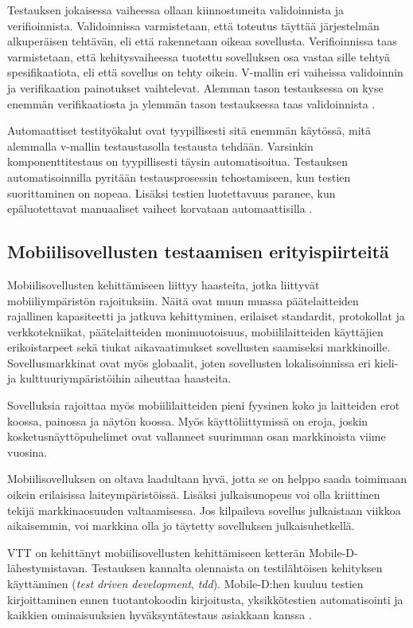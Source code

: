 Testauksen jokaisessa vaiheessa ollaan kiinnostuneita validoinnista ja verifioinnista. Validoinnissa varmistetaan, että toteutus täyttää järjestelmän alkuperäisen tehtävän, eli että rakennetaan oikeaa sovellusta. Verifioinnissa taas varmistetaan, että kehitysvaiheessa tuotettu sovelluksen osa vastaa sille tehtyä spesifikaatiota, eli että sovellus on tehty oikein. V-mallin eri vaiheissa validoinnin ja verifikaation painotukset vaihtelevat. Alemman tason testauksessa on kyse enemmän verifikaatiosta ja ylemmän tason testauksessa taas validoinnista \cite[41-42]{testing_foundations}.

Automaattiset testityökalut ovat tyypillisesti sitä enemmän käytössä, mitä alemmalla v-mallin testaustasolla testausta tehdään. Varsinkin komponenttitestaus on tyypillisesti täysin automatisoitua. Testauksen automatisoinnilla pyritään testausprosessin tehostamiseen, kun testien suorittaminen on nopeaa. Lisäksi testien luotettavuus paranee, kun epäluotettavat manuaaliset vaiheet korvataan automaattisilla \cite[201]{testing_foundations}.

\subsection{Mobiilisovellusten testaamisen erityispiirteitä}

Mobiilisovellusten kehittämiseen liittyy haasteita, jotka liittyvät mobiiliympäristön rajoituksiin. Näitä ovat muun muassa päätelaitteiden rajallinen kapasiteetti ja jatkuva kehittyminen, erilaiset standardit, protokollat ja verkkotekniikat, päätelaitteiden monimuotoisuus, mobiililaitteiden käyttäjien erikoistarpeet sekä tiukat aikavaatimukset sovellusten saamiseksi markkinoille. Sovellusmarkkinat ovat myös globaalit, joten sovellusten lokalisoinnissa eri kieli- ja kulttuuriympäristöihin aiheuttaa haasteita.

Sovelluksia rajoittaa myös mobiililaitteiden pieni fyysinen koko ja laitteiden erot koossa, painossa ja näytön koossa. Myös käyttöliittymissä on eroja, joskin kosketusnäyttöpuhelimet ovat vallanneet suurimman osan markkinoista viime vuosina.

Mobiilisovelluksen on oltava laadultaan hyvä, jotta se on helppo saada toimimaan oikein erilaisissa laiteympäristöissä. Lisäksi julkaisunopeus voi olla kriittinen tekijä markkinaosuuden valtaamisessa. Jos kilpaileva sovellus julkaistaan viikkoa aikaisemmin, voi markkina olla jo täytetty sovelluksen julkaisuhetkellä.

VTT on kehittänyt mobiilisovellusten kehittämiseen ketterän Mobile-D-lähestymistavan. Testauksen kannalta olennaista on testilähtöisen kehityksen käyttäminen (\emph{test driven development}, \emph{tdd}). Mobile-D:hen kuuluu testien kirjoittaminen ennen tuotantokoodin kirjoitusta, yksikkötestien automatisointi ja kaikkien ominaisuuksien hyväksyntätestaus asiakkaan kanssa \cite{abrahamsson04}.

